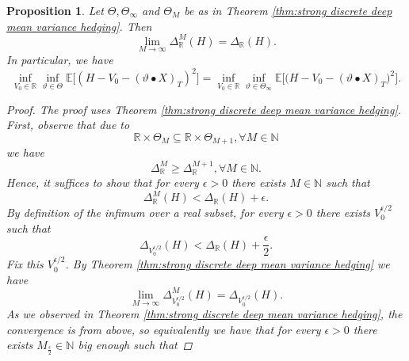 \documentclass[11pt,a4paper,twoside,openany]{report}
\numberwithin{equation}{section}
\theoremstyle{plain} %
\newtheorem{proposition}[theorem]{Proposition}
\theoremstyle{definition} %
\theoremstyle{remark} %
\begin{document}
\begin{proposition}\label{prop:finite deep mean variance hedging with variable V0}
    Let \(\Theta,\Theta_{\infty}\) and \(\Theta_M\) be as in Theorem \ref{thm:strong discrete deep mean variance hedging}. Then
    \begin{equation*}
        \lim_{M\to\infty}\Delta_{\mathbb{R}}^M(H)=\Delta_{\mathbb{R}}(H).
    \end{equation*}
 In particular, we have 
    \begin{equation*}
    \inf_{V_0\in\mathbb{R}}\inf_{\vartheta\in\Theta}\mathbb{E}\Big[(H-V_0-(\vartheta\bullet X)_T)^2\Big]=\inf_{V_0\in\mathbb{R}}\inf_{\vartheta\in\Theta_{\infty}}\mathbb{E}\Big[\big(H-V_0-(\vartheta\bullet X)_T\big)^2\Big].
    \end{equation*}
    \begin{proof}
        The proof uses Theorem \ref{thm:strong discrete deep mean variance hedging}. First, observe that due to 
        \begin{equation*}
            \mathbb{R}\times\Theta_M\subseteq \mathbb{R}\times\Theta_{M+1},\forall M\in\mathbb{N}
        \end{equation*}
        we have
        \begin{equation*}
            \Delta_{\mathbb{R}}^M\geq \Delta_{\mathbb{R}}^{M+1},\forall M\in\mathbb{N}.
        \end{equation*}
        Hence, it suffices to show that for every \(\epsilon>0\) there exists \(M\in\mathbb{N}\) such that 
        \begin{equation*}
           \Delta_{\mathbb{R}}^M(H)< \Delta_{\mathbb{R}}(H)+\epsilon.
        \end{equation*}
        By definition of the infimum over a real subset, for every \(\epsilon>0\) there exists \(V_0^{\epsilon/2}\) such that 
        \begin{equation*}
        \Delta_{V_0^{\epsilon/2}}(H)<\Delta_{\mathbb{R}}(H)+\frac{\epsilon}{2}.
        \end{equation*}
        Fix this \(V_0^{\epsilon/2}\). By Theorem \ref{thm:strong discrete deep mean variance hedging} we have
        \begin{equation*}
            \lim_{M\to\infty}\Delta_{V_0^{\epsilon/2}}^M(H)=\Delta_{V_0^{\epsilon/2}}(H).
        \end{equation*}
        As we observed in Theorem \ref{thm:strong discrete deep mean variance hedging}, the convergence is from above, so equivalently we have that for every \(\epsilon>0\) there exists \(M_{\frac{\epsilon}{2}}\in\mathbb{N}\) big enough such that

\end{proof}
\end{proposition}
\end{document}
